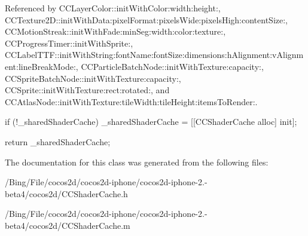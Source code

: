 Referenced by C\-C\-Layer\-Color\-::init\-With\-Color\-:width\-:height\-:, C\-C\-Texture2\-D\-::init\-With\-Data\-:pixel\-Format\-:pixels\-Wide\-:pixels\-High\-:content\-Size\-:, C\-C\-Motion\-Streak\-::init\-With\-Fade\-:min\-Seg\-:width\-:color\-:texture\-:, C\-C\-Progress\-Timer\-::init\-With\-Sprite\-:, C\-C\-Label\-T\-T\-F\-::init\-With\-String\-:font\-Name\-:font\-Size\-:dimensions\-:h\-Alignment\-:v\-Alignment\-:line\-Break\-Mode\-:, C\-C\-Particle\-Batch\-Node\-::init\-With\-Texture\-:capacity\-:, C\-C\-Sprite\-Batch\-Node\-::init\-With\-Texture\-:capacity\-:, C\-C\-Sprite\-::init\-With\-Texture\-:rect\-:rotated\-:, and C\-C\-Atlas\-Node\-::init\-With\-Texture\-:tile\-Width\-:tile\-Height\-:items\-To\-Render\-:.


\begin{DoxyCode}
{
        if (!_sharedShaderCache)
                _sharedShaderCache = [[CCShaderCache alloc] init];

        return _sharedShaderCache;
}
\end{DoxyCode}


The documentation for this class was generated from the following files\-:\begin{DoxyCompactItemize}
\item 
/\-Bing/\-File/cocos2d/cocos2d-\/iphone/cocos2d-\/iphone-\/2.-\/beta4/cocos2d/C\-C\-Shader\-Cache.\-h\item 
/\-Bing/\-File/cocos2d/cocos2d-\/iphone/cocos2d-\/iphone-\/2.-\/beta4/cocos2d/C\-C\-Shader\-Cache.\-m\end{DoxyCompactItemize}

